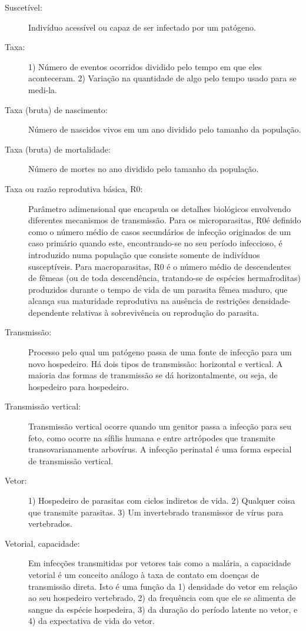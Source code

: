 \begin{description}
\item[Suscetível:] Indivíduo acessível ou capaz de ser infectado por um patógeno.

\item[Taxa:] 1) Número de eventos ocorridos dividido pelo tempo em que eles aconteceram. 2) Variação na quantidade de algo pelo tempo usado para se medi-la.

\item[Taxa (bruta) de nascimento:] Número de nascidos vivos em um ano dividido pelo tamanho da população.

\item[Taxa (bruta) de mortalidade:] Número de mortes no ano dividido pelo tamanho da população.

\item[Taxa ou razão reprodutiva básica, R0:] Parâmetro adimensional que encapsula os detalhes biológicos envolvendo diferentes mecanismos de transmissão. Para os microparasitas, R0é definido como o número médio de casos secundários de infecção originados de um caso primário quando este, encontrando-se no seu período infeccioso, é introduzido numa população que consiste somente de indivíduos susceptíveis. Para macroparasitas, R0 é o número médio de descendentes de fêmeas (ou de toda descendência, tratando-se de espécies hermafroditas) produzidos durante o tempo de vida de um parasita fêmea maduro, que alcança sua maturidade reprodutiva na ausência de restrições densidade-dependente relativas à sobrevivência ou reprodução do parasita.

\item[Transmissão:] Processo pelo qual um patógeno passa de uma fonte de infecção para um novo hospedeiro. Há dois tipos de transmissão: horizontal e vertical. A maioria das formas de transmissão se dá horizontalmente, ou seja, de hospedeiro para hospedeiro.

\item[Transmissão vertical:] Transmissão vertical ocorre quando um genitor passa a infecção para seu feto, como ocorre na sífilis humana e entre artrópodes que transmite transovarianamente arbovírus. A infecção perinatal é uma forma especial de transmissão vertical.

\item[Vetor:] 1) Hospedeiro de parasitas com ciclos indiretos de vida. 2) Qualquer coisa que transmite parasitas. 3) Um invertebrado transmissor de vírus para vertebrados.

\item[Vetorial, capacidade:] Em infecções transmitidas por vetores tais como a malária, a capacidade vetorial é um conceito análogo à taxa de contato em doenças de transmissão direta. Isto é uma função da 1) densidade do vetor em relação ao seu hospedeiro vertebrado, 2) da frequência com que ele se alimenta de sangue da espécie hospedeira, 3) da duração do período latente no vetor, e 4) da expectativa de vida do vetor.


\end{description}
